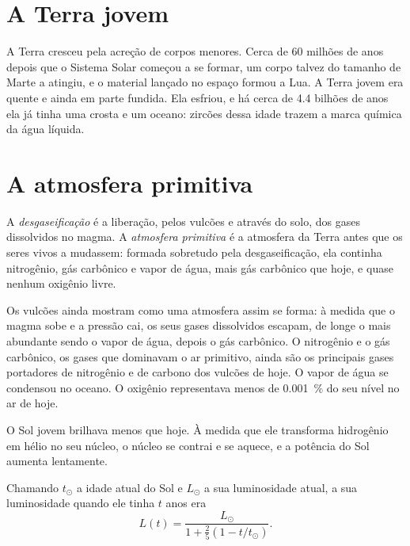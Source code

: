 \section{A Terra jovem}

A Terra cresceu pela acreção de corpos menores. Cerca de 60 milhões de anos
depois que o Sistema Solar começou a se formar, um corpo talvez do tamanho
de Marte a atingiu, e o material lançado no espaço formou a Lua. A Terra
jovem era quente e ainda em parte fundida. Ela esfriou, e há cerca de 4.4
bilhões de anos ela já tinha uma crosta e um oceano: zircões dessa idade
trazem a marca química da água líquida.

\section{A atmosfera primitiva}

\begin{definition}\label{def:g12:early-earth:primitive-atmosphere}
A \emph{desgaseificação} é a
liberação, pelos vulcões e através do solo, dos gases dissolvidos no magma.
A \emph{atmosfera primitiva} é a atmosfera da
Terra antes que os seres vivos a mudassem: formada sobretudo pela
desgaseificação, ela continha nitrogênio, gás carbônico e vapor de água,
mais gás carbônico que hoje, e quase nenhum oxigênio livre.
\end{definition}

Os vulcões ainda mostram como uma atmosfera assim se forma: à medida que o
magma sobe e a pressão cai, os seus gases dissolvidos escapam, de longe o
mais abundante sendo o vapor de água, depois o gás carbônico. O nitrogênio e
o gás carbônico, os gases que dominavam o ar primitivo, ainda são os
principais gases portadores de nitrogênio e de carbono dos vulcões de hoje.
O vapor de água se condensou no oceano. O oxigênio representava menos de
\qty{0.001}{\percent} do seu nível no ar de hoje.

O Sol jovem brilhava menos que hoje. À medida que ele transforma hidrogênio
em hélio no seu núcleo, o núcleo se contrai e se aquece, e a potência do Sol
aumenta lentamente.

\begin{proposition}\label{prop:g12:early-earth:luminosity}
Chamando $t_\odot$ a idade atual do Sol e $L_\odot$ a sua luminosidade
atual, a sua luminosidade quando ele tinha $t$ anos era
\[
  L(t) = \frac{L_\odot}{1 + \frac{2}{5}\left(1 - t/t_\odot\right)} .
\]
\end{proposition}

